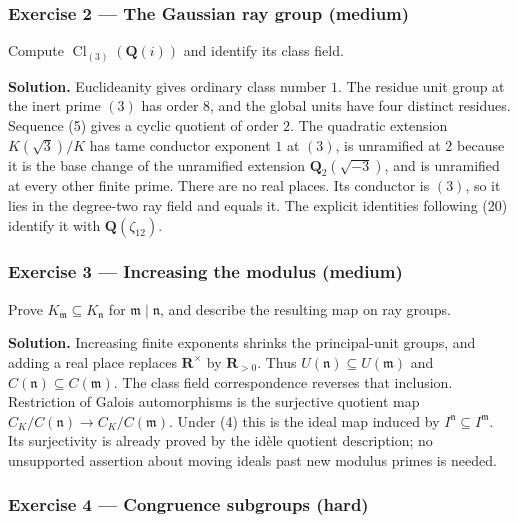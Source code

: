 \documentclass[11pt,a4paper]{article}
\begin{document}
\subsubsection{Exercise 2 --- The Gaussian ray group
(medium)}\label{exercise-2-the-gaussian-ray-group-medium}

Compute \(\operatorname{Cl}_{(3)}(\mathbf Q(i))\) and identify its class
field.

\textbf{Solution.} Euclideanity gives ordinary class number \(1\). The
residue unit group at the inert prime \((3)\) has order \(8\), and the
global units have four distinct residues. Sequence (5) gives a cyclic
quotient of order \(2\). The quadratic extension \(K(\sqrt3)/K\) has
tame conductor exponent \(1\) at \((3)\), is unramified at \(2\) because
it is the base change of the unramified extension
\(\mathbf Q_2(\sqrt{-3})\), and is unramified at every other finite
prime. There are no real places. Its conductor is \((3)\), so it lies in
the degree-two ray field and equals it. The explicit identities
following (20) identify it with \(\mathbf Q(\zeta_{12})\).

\subsubsection{Exercise 3 --- Increasing the modulus
(medium)}\label{exercise-3-increasing-the-modulus-medium}

Prove \(K_{\mathfrak m}\subseteq K_{\mathfrak n}\) for
\(\mathfrak m\mid\mathfrak n\), and describe the resulting map on ray
groups.

\textbf{Solution.} Increasing finite exponents shrinks the
principal-unit groups, and adding a real place replaces
\(\mathbf R^\times\) by \(\mathbf R_{>0}\). Thus
\(U(\mathfrak n)\subseteq U(\mathfrak m)\) and
\(C(\mathfrak n)\subseteq C(\mathfrak m)\). The class field
correspondence reverses that inclusion. Restriction of Galois
automorphisms is the surjective quotient map
\(C_K/C(\mathfrak n)\to C_K/C(\mathfrak m)\). Under (4) this is the
ideal map induced by \(I^{\mathfrak n}\subseteq I^{\mathfrak m}\). Its
surjectivity is already proved by the idèle quotient description; no
unsupported assertion about moving ideals past new modulus primes is
needed.

\subsubsection{Exercise 4 --- Congruence subgroups
(hard)}\label{exercise-4-congruence-subgroups-hard}
\end{document}
